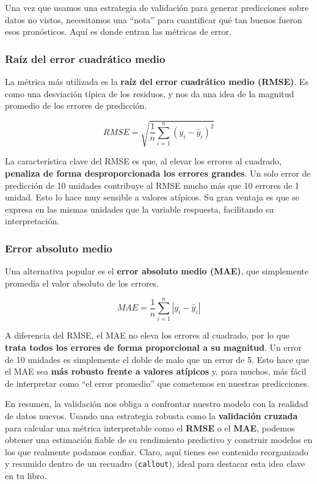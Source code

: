 \documentclass[
  letterpaper,
  DIV=11,
  numbers=noendperiod]{scrreprt}
\begin{document}
Una vez que usamos una estrategia de validación para generar
predicciones sobre datos no vistos, necesitamos una ``nota'' para
cuantificar qué tan buenos fueron esos pronósticos. Aquí es donde entran
las métricas de error.

\subsubsection{Raíz del error cuadrático
medio}\label{rauxedz-del-error-cuadruxe1tico-medio}

La métrica más utilizada es la \textbf{raíz del error cuadrático medio
(RMSE)}. Es como una desviación típica de los residuos, y nos da una
idea de la magnitud promedio de los errores de predicción.

\[RMSE = \sqrt{\frac{1}{n}\sum_{i=1}^{n}(y_i - \hat{y}_i)^2}\]

La característica clave del RMSE es que, al elevar los errores al
cuadrado, \textbf{penaliza de forma desproporcionada los errores
grandes}. Un solo error de predicción de 10 unidades contribuye al RMSE
mucho más que 10 errores de 1 unidad. Esto lo hace muy sensible a
valores atípicos. Su gran ventaja es que se expresa en las mismas
unidades que la variable respuesta, facilitando su interpretación.

\subsubsection{Error absoluto medio}\label{error-absoluto-medio}

Una alternativa popular es el \textbf{error absoluto medio (MAE)}, que
simplemente promedia el valor absoluto de los errores.

\[MAE = \frac{1}{n}\sum_{i=1}^{n}|y_i - \hat{y}_i|\]

A diferencia del RMSE, el MAE no eleva los errores al cuadrado, por lo
que \textbf{trata todos los errores de forma proporcional a su
magnitud}. Un error de 10 unidades es simplemente el doble de malo que
un error de 5. Esto hace que el MAE sea \textbf{más robusto frente a
valores atípicos} y, para muchos, más fácil de interpretar como ``el
error promedio'' que cometemos en nuestras predicciones.

En resumen, la validación nos obliga a confrontar nuestro modelo con la
realidad de datos nuevos. Usando una estrategia robusta como la
\textbf{validación cruzada} para calcular una métrica interpretable como
el \textbf{RMSE} o el \textbf{MAE}, podemos obtener una estimación
fiable de su rendimiento predictivo y construir modelos en los que
realmente podamos confiar. Claro, aquí tienes ese contenido reorganizado
y resumido dentro de un recuadro (\texttt{callout}), ideal para destacar
esta idea clave en tu libro.
\end{document}
